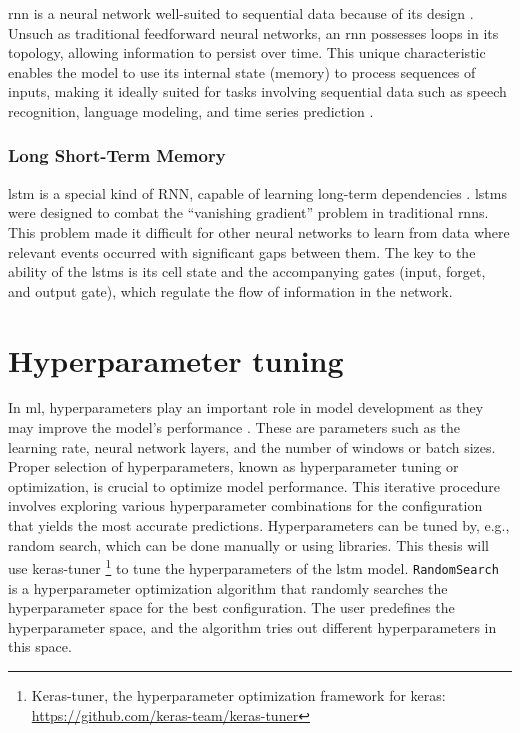 \ac{rnn} is a neural network well-suited to sequential data because of its design \cite{hopfield-rnn}.
Unsuch as traditional feedforward neural networks, an \ac{rnn} possesses loops in its topology, allowing information to persist over time.
This unique characteristic enables the model to use its internal state (memory) to process sequences of inputs, making it ideally suited for tasks involving sequential data such as speech recognition, language modeling, and time series prediction \cite{elman_finding_1990}.

\subsubsection{Long Short-Term Memory}

\ac{lstm} is a special kind of RNN, capable of learning long-term dependencies \cite{lstm-hochreiter}.
\acp{lstm} were designed to combat the ``vanishing gradient'' problem in traditional \acp{rnn}. 
This problem made it difficult for other neural networks to learn from data where relevant events occurred with significant gaps between them.
The key to the ability of the \acp{lstm} is its cell state and the accompanying gates (input, forget, and output gate), which regulate the flow of information in the network.

\section{Hyperparameter tuning}\label{sec:hyperparameter-tuning}

In \ac{ml}, hyperparameters play an important role in model development as they may improve the model's performance \cite{yuHyperParameterOptimizationReview2020}.
These are parameters such as the learning rate, neural network layers, and the number of windows or batch sizes.
Proper selection of hyperparameters, known as hyperparameter tuning or optimization, is crucial to optimize model performance.
This iterative procedure involves exploring various hyperparameter combinations for the configuration that yields the most accurate predictions.
Hyperparameters can be tuned by, e.g., random search, which can be done manually or using libraries.
This thesis will use keras-tuner \footnote{Keras-tuner, the hyperparameter optimization framework for keras: \url{https://github.com/keras-team/keras-tuner}} to tune the hyperparameters of the \ac{lstm} model.
\texttt{RandomSearch} is a hyperparameter optimization algorithm that randomly searches the hyperparameter space for the best configuration.
The user predefines the hyperparameter space, and the algorithm tries out different hyperparameters in this space.
